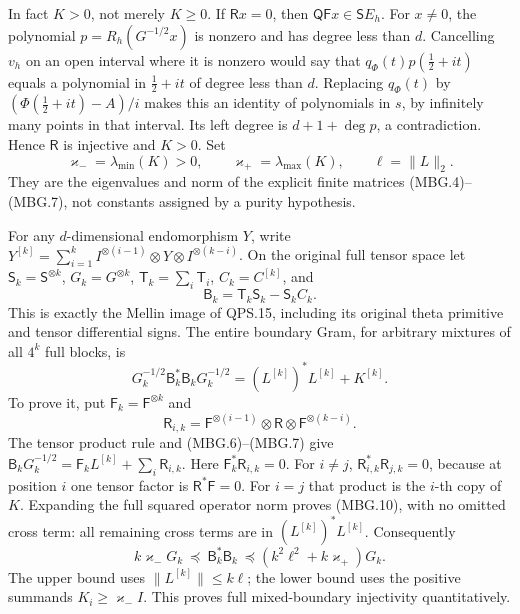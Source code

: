 In fact \(K>0\), not merely \(K\ge0\). If \(\mathsf R x=0\), then
\(\mathsf Q\mathsf F x\in\mathsf S E_h\). For \(x\ne0\), the
polynomial \(p=R_h(G^{-1/2}x)\) is nonzero and has degree less than
\(d\). Cancelling \(v_h\) on an open interval where it is nonzero
would say that \(q_\Phi(t)p(\tfrac12+it)\) equals a polynomial in
\(\tfrac12+it\) of degree less than \(d\). Replacing \(q_\Phi(t)\)
by \((\Phi(\tfrac12+it)-A)/i\) makes this an identity of polynomials
in \(s\), by infinitely many points in that interval. Its left
degree is \(d+1+\deg p\), a contradiction. Hence \(\mathsf R\) is
injective and \(K>0\). Set
\[
 \varkappa_-=\lambda_{\min}(K)>0,\qquad
 \varkappa_+=\lambda_{\max}(K),\qquad \ell=\|L\|_2 .
 \tag{MBG.8}\label{eq:mbg-finite-constants}
\]
They are the eigenvalues and norm of the explicit finite matrices
(MBG.4)--(MBG.7), not constants assigned by a purity hypothesis.

For any \(d\)-dimensional endomorphism \(Y\), write
\(Y^{[k]}=\sum_{i=1}^k I^{\otimes(i-1)}\otimes Y\otimes
I^{\otimes(k-i)}\). On the original full tensor space let
\(\mathsf S_k=\mathsf S^{\otimes k}\), \(G_k=G^{\otimes k}\),
\(\mathsf T_k=\sum_i\mathsf T_i\), \(C_k=C^{[k]}\), and
\[
 \mathsf B_k=\mathsf T_k\mathsf S_k-\mathsf S_k C_k .
 \tag{MBG.9}\label{eq:mbg-boundary}
\]
This is exactly the Mellin image of QPS.15, including its original
theta primitive and tensor differential signs. The entire boundary
Gram, for arbitrary mixtures of all \(4^k\) full blocks, is
\[
 \boxed{\quad
 G_k^{-1/2}\mathsf B_k^*\mathsf B_kG_k^{-1/2}
       =(L^{[k]})^*L^{[k]}+K^{[k]} .\quad}
 \tag{MBG.10}\label{eq:mbg-total-gram}
\]
To prove it, put \(\mathsf F_k=\mathsf F^{\otimes k}\) and
\[
 \mathsf R_{i,k}
   =\mathsf F^{\otimes(i-1)}\otimes\mathsf R
                                  \otimes\mathsf F^{\otimes(k-i)}.
\]
The tensor product rule and (MBG.6)--(MBG.7) give
\(\mathsf B_kG_k^{-1/2}
=\mathsf F_kL^{[k]}+\sum_i\mathsf R_{i,k}\).
Here \(\mathsf F_k^*\mathsf R_{i,k}=0\). For \(i\ne j\),
\(\mathsf R_{i,k}^*\mathsf R_{j,k}=0\), because at position \(i\)
one tensor factor is \(\mathsf R^*\mathsf F=0\). For \(i=j\) that
product is the \(i\)-th copy of \(K\). Expanding the full squared
operator norm proves (MBG.10), with no omitted cross term:
all remaining cross terms are in \((L^{[k]})^*L^{[k]}\).
Consequently
\[
 k\varkappa_-G_k\ \preceq\ \mathsf B_k^*\mathsf B_k\
 \preceq (k^2\ell^2+k\varkappa_+)G_k .
 \tag{MBG.11}\label{eq:mbg-boundary-bounds}
\]
The upper bound uses \(\|L^{[k]}\|\le k\ell\); the lower bound uses
the positive summands \(K_i\ge\varkappa_-I\).
This proves full mixed-boundary injectivity quantitatively.

